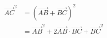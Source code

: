 \documentclass[preview]{standalone}
\begin{document}
\begin{align*}
\overrightarrow{AC}^2 &= (\overrightarrow{AB} + \overrightarrow{BC})^2\\&= \overrightarrow{AB}^2 + 2\overrightarrow{AB}\cdot\overrightarrow{BC} + \overrightarrow{BC}^2
\end{align*}
\end{document}
